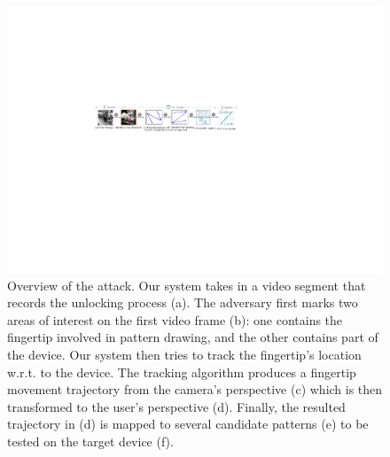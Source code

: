\begin{figure}[!ht]
    \centering
    \includegraphics[width=\textwidth]{fig/overview.pdf}
    \vspace{-4mm}
    \caption{Overview of the attack.
     Our system takes in a video segment that records the unlocking process (a). The adversary first marks two areas of interest on the first video frame (b): one contains the fingertip involved in pattern drawing, and the other contains part of the device. Our system then tries to track the fingertip's location w.r.t. to the device.
     The tracking algorithm produces a fingertip movement trajectory from the camera's perspective (c) which is then transformed to the user's perspective (d). Finally, the resulted trajectory in (d) is mapped to several candidate patterns (e) to be tested on the target device (f). }
    \label{fig:fig2}
    \vspace{-3mm}
\end{figure}

